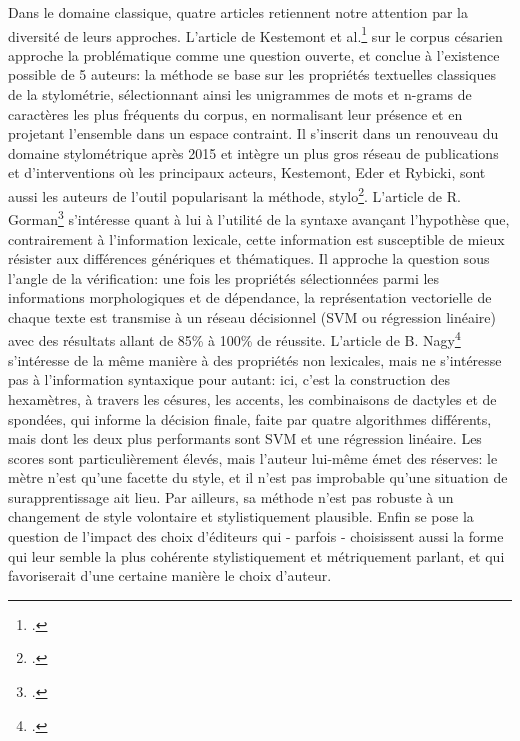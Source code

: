 Dans le domaine classique, quatre articles retiennent notre attention par la diversité de leurs approches. L'article de Kestemont et al.\footcite{kestemont_authenticating_2016} sur le corpus césarien approche la problématique comme une question ouverte, et conclue à l'existence possible de 5 auteurs: la méthode se base sur les propriétés textuelles classiques de la stylométrie, sélectionnant ainsi les unigrammes de mots et n-grams de caractères les plus fréquents du corpus, en normalisant leur présence et en projetant l'ensemble dans un espace contraint. Il s'inscrit dans un renouveau du domaine stylométrique après 2015 et intègre un plus gros réseau de publications et d'interventions où les principaux acteurs, Kestemont, Eder et Rybicki, sont aussi les auteurs de l'outil popularisant la méthode, stylo\footcite{stylo_r}. %
L'article de R. Gorman\footcite{gorman_author_2020} s'intéresse quant à lui à l'utilité de la syntaxe avançant l'hypothèse que, contrairement à l'information lexicale, cette information est susceptible de mieux résister aux différences génériques et thématiques. Il approche la question sous l'angle de la vérification: une fois les propriétés sélectionnées parmi les informations morphologiques et de dépendance, la représentation vectorielle de chaque texte est transmise à un réseau décisionnel (SVM ou régression linéaire) avec des résultats allant de 85\% à 100\% de réussite.
L'article de B. Nagy\footcite{nagy_metre_2021} s'intéresse de la même manière à des propriétés non lexicales, mais ne s'intéresse pas à l'information syntaxique pour autant: ici, c'est la construction des hexamètres, à travers les césures, les accents, les combinaisons de dactyles et de spondées, qui informe la décision finale, faite par quatre algorithmes différents, mais dont les deux plus performants sont SVM et une régression linéaire. Les scores sont particulièrement élevés, mais l'auteur lui-même émet des réserves: le mètre n'est qu'une facette du style, et il n'est pas improbable qu'une situation de surapprentissage ait lieu. Par ailleurs, sa méthode n'est pas robuste à un changement de style volontaire et stylistiquement plausible. Enfin se pose la question de l'impact des choix d'éditeurs qui - parfois - choisissent aussi la forme qui leur semble la plus cohérente stylistiquement et métriquement parlant, et qui favoriserait d'une certaine manière le choix d'auteur. %
